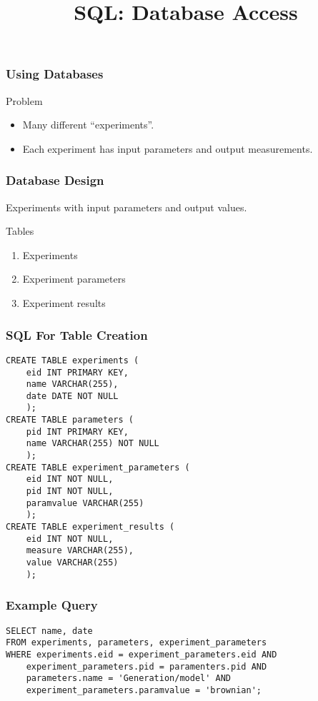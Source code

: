 
\title{SQL: Database Access}

\frame{\maketitle}

\begin{frame}[fragile]
\frametitle{Using Databases}

Problem
\begin{itemize}
\item Many different ``experiments''.
\item Each experiment has input parameters and output measurements.
\end{itemize}

\end{frame}

\begin{frame}[fragile]
\frametitle{Database Design}

Experiments with input parameters and output values.

\pause
Tables
\begin{enumerate}
\item Experiments
\item Experiment parameters
\item Experiment results
\end{enumerate}

\end{frame}

\begin{frame}[fragile]
\frametitle{SQL For Table Creation}

\begin{verbatim}
CREATE TABLE experiments (
    eid INT PRIMARY KEY,
    name VARCHAR(255),
    date DATE NOT NULL
    );
CREATE TABLE parameters (
    pid INT PRIMARY KEY,
    name VARCHAR(255) NOT NULL
    );
CREATE TABLE experiment_parameters (
    eid INT NOT NULL,
    pid INT NOT NULL,
    paramvalue VARCHAR(255)
    );
CREATE TABLE experiment_results (
    eid INT NOT NULL,
    measure VARCHAR(255),
    value VARCHAR(255)
    );
\end{verbatim}
\end{frame}

\begin{frame}[fragile]
\frametitle{Example Query}
\begin{verbatim}
SELECT name, date
FROM experiments, parameters, experiment_parameters
WHERE experiments.eid = experiment_parameters.eid AND
    experiment_parameters.pid = paramenters.pid AND
    parameters.name = 'Generation/model' AND
    experiment_parameters.paramvalue = 'brownian';
\end{verbatim}
\end{frame}


